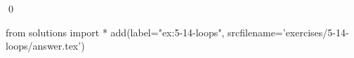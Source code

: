 
\begin{ex}
  \label{ex:5-14-loops}
  
  \qed
\end{ex}
\begin{python0}
from solutions import *
add(label="ex:5-14-loops",
    srcfilename='exercises/5-14-loops/answer.tex')
\end{python0}
